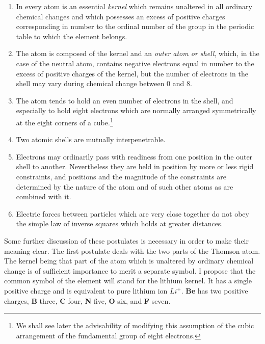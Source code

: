 \documentclass[11pt]{memoir}
\begin{document}
\begin{enumerate}
\item In every atom is an essential \emph{kernel} which remains unaltered in all ordinary chemical changes and which possesses an excess of positive charges corresponding in number to the ordinal number of the group in the periodic table to which the element belongs.
\item The atom is composed of the kernel and an \emph{outer atom or shell}, which, in the case of the neutral atom, contains negative electrons equal in number to the excess of positive charges of the kernel, but the number of electrons in the shell may vary during chemical change between 0 and 8.
\item The atom tends to hold an even number of electrons in the shell, and especially to hold eight electrons which are normally arranged symmetrically at the eight corners of a cube.\footnote{We shall see later the advisability of modifying this assumption of the cubic arrangement of the fundamental group of eight electrons.}
\item Two atomic shells are mutually interpenetrable.
\item Electrons may ordinarily pass with readiness from one position in the outer shell to another.  Nevertheless they are held in position by more or less rigid constraints, and positions and the magnitude of the constraints are determined by the nature of the atom and of such other atoms as are combined with it.
\item Electric forces between particles which are very close together do not obey the simple law of inverse squares which holds at greater distances.
\end{enumerate}

Some further discussion of these postulates is necessary in order to make their meaning clear.  The first postulate deals with the two parts of the Thomson atom.  The kernel being that part of the atom which is unaltered by ordinary chemical change is of sufficient importance to merit a separate symbol.  I propose that the common symbol of the element will stand for the lithium kernel.  It has a single positive charge and is equivalent to pure lithium ion $Li^+$.  \textbf{Be} has two positive charges, \textbf {B} three, \textbf{C} four, \textbf{N} five, \textbf{O} six, and \textbf{F} seven.
\end{document}
